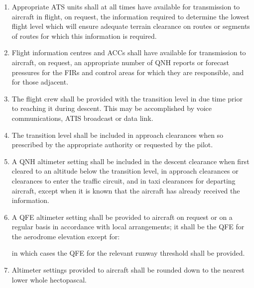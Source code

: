 \documentclass[../vATM.tex]{subfiles}
\begin{document}
    \begin{enumerate}
        \item Appropriate ATS units shall at all times have available for transmission to aircraft in flight, on request, the information required to determine the lowest flight level which will ensure adequate terrain clearance on routes or segments of routes for which this information is required.


        \item Flight information centres and ACCs shall have available for transmission to aircraft, on request, an appropriate number of QNH reports or forecast pressures for the FIRs and control areas for which they are responsible, and for those adjacent.
        \item The flight crew shall be provided with the transition level in due time prior to reaching it during descent. This may be accomplished by voice communications, ATIS broadcast or data link.
        \item The transition level shall be included in approach clearances when so prescribed by the appropriate authority or requested by the pilot.
        \item A QNH altimeter setting shall be included in the descent clearance when first cleared to an altitude below the transition level, in approach clearances or clearances to enter the traffic circuit, and in taxi clearances for departing aircraft, except when it is known that the aircraft has already received the information.
        \item A QFE altimeter setting shall be provided to aircraft on request or on a regular basis in accordance with local arrangements; it shall be the QFE for the aerodrome elevation except for:


        \noindent in which cases the QFE for the relevant runway threshold shall be provided.

        \item Altimeter settings provided to aircraft shall be rounded down to the nearest lower whole hectopascal.


\end{enumerate}
\end{document}
